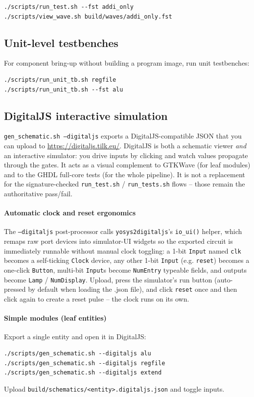 \begin{lstlisting}[style=minrv]
./scripts/run_test.sh --fst addi_only
./scripts/view_wave.sh build/waves/addi_only.fst
\end{lstlisting}

\subsection{Unit-level testbenches}
For component bring-up without building a program image, run unit testbenches:
\begin{lstlisting}[style=minrv]
./scripts/run_unit_tb.sh regfile
./scripts/run_unit_tb.sh --fst alu
\end{lstlisting}

\subsection{DigitalJS interactive simulation}
\label{sec:digitaljs}
\texttt{gen\_schematic.sh --digitaljs} exports a DigitalJS-compatible JSON that you
can upload to \url{https://digitaljs.tilk.eu/}.  DigitalJS is both a schematic
viewer \emph{and} an interactive simulator: you drive inputs by clicking and watch
values propagate through the gates.  It acts as a visual complement to GTKWave
(for leaf modules) and to the GHDL full-core tests (for the whole pipeline).  It
is not a replacement for the signature-checked \texttt{run\_test.sh} /
\texttt{run\_tests.sh} flows -- those remain the authoritative pass/fail.

\paragraph{Automatic clock and reset ergonomics}
The \texttt{--digitaljs} post-processor calls \texttt{yosys2digitaljs}'s
\texttt{io\_ui()} helper, which remaps raw port devices into simulator-UI
widgets so the exported circuit is immediately runnable without manual clock
toggling: a 1-bit \texttt{Input} named \texttt{clk} becomes a
self-ticking \texttt{Clock} device, any other 1-bit \texttt{Input} (e.g.
\texttt{reset}) becomes a one-click \texttt{Button}, multi-bit \texttt{Input}s
become \texttt{NumEntry} typeable fields, and outputs become \texttt{Lamp} /
\texttt{NumDisplay}.  Upload, press the simulator's run button (auto-pressed by default when loading the .json file), and click
\texttt{reset} once and then click again to create a reset pulse -- the clock runs on its own.

\paragraph{Simple modules (leaf entities)}
Export a single entity and open it in DigitalJS:
\begin{lstlisting}[style=minrv]
./scripts/gen_schematic.sh --digitaljs alu
./scripts/gen_schematic.sh --digitaljs regfile
./scripts/gen_schematic.sh --digitaljs extend
\end{lstlisting}
Upload \texttt{build/schematics/<entity>.digitaljs.json} and toggle inputs.

